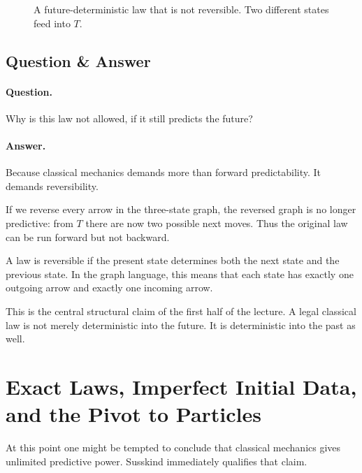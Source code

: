 \begin{figure}
\centering
{}
\caption{A future-deterministic law that is not reversible. Two different states feed into \(T\).}
\end{figure}

\subsection{Question \& Answer}

\paragraph{Question.} Why is this law not allowed, if it still predicts the future?

\paragraph{Answer.} Because classical mechanics demands more than forward predictability. It demands reversibility.

If we reverse every arrow in the three-state graph, the reversed graph is no longer predictive: from \(T\) there are now two possible next moves. Thus the original law can be run forward but not backward.

\begin{definition}
A law is reversible if the present state determines both the next state and the previous state. In the graph language, this means that each state has exactly one outgoing arrow and exactly one incoming arrow.
\end{definition}

This is the central structural claim of the first half of the lecture. A legal classical law is not merely deterministic into the future. It is deterministic into the past as well.

\section{Exact Laws, Imperfect Initial Data, and the Pivot to Particles}

At this point one might be tempted to conclude that classical mechanics gives unlimited predictive power. Susskind immediately qualifies that claim.

